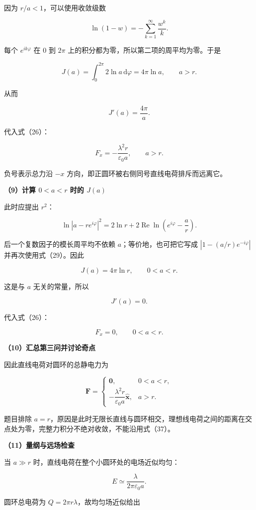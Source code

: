 \documentclass[12pt,a4paper,UTF8]{ctexart}
\begin{document}
因为 \(r/a<1\)，可以使用收敛级数

\[
\ln(1-w)=-\sum_{k=1}^{\infty}\frac{w^k}{k}.
\tag{29}
\]

每个 \(e^{ik\varphi}\) 在 \(0\) 到 \(2\pi\)
上的积分都为零，所以第二项的周平均为零。于是

\[
J(a)=\int_0^{2\pi}2\ln a\,\mathrm d\varphi
=4\pi\ln a,
\qquad a>r.
\tag{30}
\]

从而

\[
J'(a)=\frac{4\pi}{a}.
\tag{31}
\]

代入式（26）：

\[
\boxed{
F_x=-\frac{\lambda^2r}{\varepsilon_0a},
\qquad a>r
}.
\tag{32}
\]

负号表示总力沿 \(-x\) 方向，即正圆环被右侧同号直线电荷排斥而远离它。

\textbf{（9）计算 \(0<a<r\) 时的 \(J(a)\)}

此时应提出 \(r^2\)：

\[
\ln|a-re^{i\varphi}|^2
=2\ln r
+2\operatorname{Re}\ln\!\left(e^{i\varphi}-\frac ar\right).
\tag{33}
\]

后一个复数因子的模长周平均不依赖 \(a\)；等价地，也可把它写成
\(|1-(a/r)e^{-i\varphi}|\) 并再次使用式（29）。因此

\[
J(a)=4\pi\ln r,
\qquad 0<a<r.
\tag{34}
\]

这是与 \(a\) 无关的常量，所以

\[
J'(a)=0.
\tag{35}
\]

代入式（26）：

\[
\boxed{F_x=0,\qquad 0<a<r}.
\tag{36}
\]

\textbf{（10）汇总第三问并讨论奇点}

因此直线电荷对圆环的总静电力为

\[
\boxed{
\boldsymbol F=
\begin{cases}
\boldsymbol 0, & 0<a<r,\\[4pt]
-\dfrac{\lambda^2r}{\varepsilon_0a}\hat{\boldsymbol x}, & a>r.
\end{cases}
}
\tag{37}
\]

题目排除
\(a=r\)，原因是此时无限长直线与圆环相交，理想线电荷之间的距离在交点处为零，完整力积分不绝对收敛，不能沿用式（37）。

\textbf{（11）量纲与远场检查}

当 \(a\gg r\) 时，直线电荷在整个小圆环处的电场近似均匀：

\[
E\simeq\frac{\lambda}{2\pi\varepsilon_0a}.
\]

圆环总电荷为 \(Q=2\pi r\lambda\)，故均匀场近似给出
\end{document}
